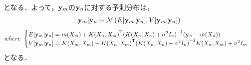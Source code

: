 \documentclass[11pt,a4j]{article}
\begin{document}
      となる．よって，${\bf y}_m$の${\bf y}_n$に対する予測分布は，
      \begin{align}
        {\bf y}_m | {\bf y}_n \sim \mathcal{N}\left( E[{\bf y}_m | {\bf y}_n], V[{\bf y}_m | {\bf y}_n] \right) 
      \end{align}
      \begin{align}          
        where ~ 
        \begin{cases}
          E[{\bf y}_m | {\bf y}_n] = m(X_m) + {K(X_n,X_m)}^{\mathrm{T}} {( K(X_n,X_n) + \sigma^2 I_n )} ^{-1} ( {\bf y}_n - m(X_n) ) \\
          V[{\bf y}_m | {\bf y}_n] = K(X_m,X_m) - {K(X_n,X_m)}^{\mathrm{T}} { ( K(X_n,X_n) + \sigma^2 I_n ) }^{-1} K(X_n,X_m) + \sigma^2 I_m
        \end{cases} \nonumber
      \end{align}
      となる．
    
\end{document}
